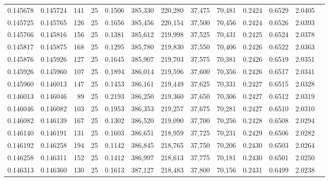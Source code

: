 \begin{tabular}{rrrrrrrrrrrrr}
0.145678 & 0.145724 &   141 &  25 &                                     0.1506 & 385,330 & 220,280 &  37,475 &  70,481 & 0.2424 & 0.6529 & 2.0405 \\
0.145725 & 0.145765 &   126 &  25 &                                     0.1656 & 385,456 & 220,154 &  37,500 &  70,456 & 0.2424 & 0.6526 & 2.0393 \\
0.145766 & 0.145816 &   156 &  25 &                                     0.1381 & 385,612 & 219,998 &  37,525 &  70,431 & 0.2425 & 0.6524 & 2.0378 \\
0.145817 & 0.145875 &   168 &  25 &                                     0.1295 & 385,780 & 219,830 &  37,550 &  70,406 & 0.2426 & 0.6522 & 2.0363 \\
0.145876 & 0.145926 &   127 &  25 &                                     0.1645 & 385,907 & 219,703 &  37,575 &  70,381 & 0.2426 & 0.6519 & 2.0351 \\
0.145926 & 0.145960 &   107 &  25 &                                     0.1894 & 386,014 & 219,596 &  37,600 &  70,356 & 0.2426 & 0.6517 & 2.0341 \\
0.145960 & 0.146013 &   147 &  25 &                                     0.1453 & 386,161 & 219,449 &  37,625 &  70,331 & 0.2427 & 0.6515 & 2.0328 \\
0.146013 & 0.146046 &    89 &  25 &                                     0.2193 & 386,250 & 219,360 &  37,650 &  70,306 & 0.2427 & 0.6512 & 2.0319 \\
0.146046 & 0.146082 &   103 &  25 &                                     0.1953 & 386,353 & 219,257 &  37,675 &  70,281 & 0.2427 & 0.6510 & 2.0310 \\
0.146082 & 0.146139 &   167 &  25 &                                     0.1302 & 386,520 & 219,090 &  37,700 &  70,256 & 0.2428 & 0.6508 & 2.0294 \\
0.146140 & 0.146191 &   131 &  25 &                                     0.1603 & 386,651 & 218,959 &  37,725 &  70,231 & 0.2429 & 0.6506 & 2.0282 \\
0.146192 & 0.146258 &   194 &  25 &                                     0.1142 & 386,845 & 218,765 &  37,750 &  70,206 & 0.2430 & 0.6503 & 2.0264 \\
0.146258 & 0.146311 &   152 &  25 &                                     0.1412 & 386,997 & 218,613 &  37,775 &  70,181 & 0.2430 & 0.6501 & 2.0250 \\
0.146313 & 0.146360 &   130 &  25 &                                     0.1613 & 387,127 & 218,483 &  37,800 &  70,156 & 0.2431 & 0.6499 & 2.0238 \\

\end{tabular}
